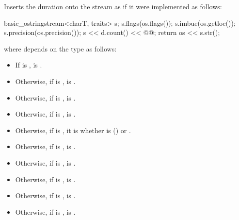 \begin{itemdescr}
\pnum
\effects
Inserts the duration  onto the stream 
as if it were implemented as follows:
\begin{codeblock}
basic_ostringstream<charT, traits> s;
s.flags(os.flags());
s.imbue(os.getloc());
s.precision(os.precision());
s << d.count() << @@;
return os << s.str();
\end{codeblock}
where 
depends on the type  as follows:

\begin{itemize}
\item
If  is ,
 is .

\item
Otherwise, if  is ,
 is .

\item
Otherwise, if  is ,
 is .

\item
Otherwise, if  is ,
 is .

\item
Otherwise, if  is ,
it is
whether  is
 () or
.

\item
Otherwise, if  is ,
 is .

\item
Otherwise, if  is ,
 is .

\item
Otherwise, if  is ,
 is .

\item
Otherwise, if  is ,
 is .

\item
Otherwise, if  is ,
 is .


\end{itemize}
\end{itemdescr}

